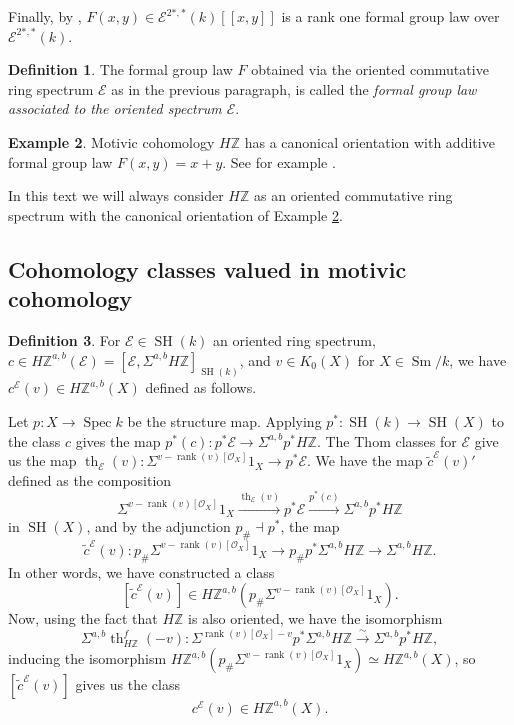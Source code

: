 \documentclass[10pt]{amsart}
\theoremstyle{definition}
\newtheorem{defn}{Definition}[section]
\newtheorem{exmp}[defn]{Example}
\theoremstyle{plain}
\numberwithin{equation}{section}
\newcommand{\0}{\emptyset}
\newcommand{\sE}{{\mathcal E}}
\newcommand{\sO}{{\mathcal O}}
\newcommand{\Z}{{\mathbb Z}}
\newcommand{\Spec}{{\operatorname{Spec}}}
\newcommand{\SH}{{\operatorname{SH}}}
\newcommand{\Sm}{{\operatorname{Sm}}}
\renewcommand{\th}{{\operatorname{th}}}
\newcommand{\rnk}{{\operatorname{rank}}}
\begin{document}
Finally, by \cite[Proposition 3.38]{Pan:oriented}, $F(x, y)\in  \sE^{2*,*}(k)[[x, y]]$ is a rank one formal group law over $\sE^{2*,*}(k)$.

\begin{defn}
    The formal group law $F$ obtained via the oriented commutative ring spectrum $\sE$ as in the previous paragraph, is called the \emph{formal group law associated to the oriented spectrum $\sE$}. 
\end{defn}

\begin{exmp}
\label{exmp:orientedHZ}
    Motivic cohomology $H\Z$ has a canonical orientation with additive formal group law $F(x,y)=x + y$. See for example \cite[Section 11.3]{deglise:mixmot}.  
\end{exmp}

In this text we will always consider $H\Z$ as an oriented commutative ring spectrum with the canonical orientation of Example \ref{exmp:orientedHZ}.

\subsection{Cohomology classes valued in motivic cohomology}
\label{sec:motiviccohomology}

\begin{defn}
\label{defn:HZclasses}
For $\sE\in \SH(k)$ an oriented ring spectrum, $c\in H\Z^{a,b}(\sE)=[\sE, \Sigma^{a,b}H\Z]_{\SH(k)}$, and $v\in K_0(X)$ for $X\in \Sm/k$, we have $c^\sE(v)\in H\Z^{a,b}(X)$ defined as follows. 

Let $p:X \to \Spec k$ be the structure map. Applying $p^*:\SH(k)\to \SH(X)$ to the class $c$ gives the map $p^*(c):p^*\sE\to \Sigma^{a,b}p^*H\Z$. 
The Thom classes for $\sE$ give us the map $\th_\sE(v):\Sigma^{v-\rnk(v)[\sO_X]}1_X\to p^*\sE$.  
We have the map $\tilde{c}^\sE(v)'$ defined as the composition
\[
\Sigma^{v-\rnk(v)[\sO_X]}1_X\xrightarrow{\th_\sE(v)} p^*\sE\xrightarrow{p^*(c)}\Sigma^{a,b}p^*H\Z
\]
in $\SH(X)$, and by the adjunction $p_\# \dashv p^*$, the map
\[
\tilde{c}^\sE(v):p_\#\Sigma^{v-\rnk(v)[\sO_X]}1_X\to p_{\#}p^*\Sigma^{a,b}H\Z \to \Sigma^{a,b}H\Z.
\]
In other words, we have constructed a class
\[
[\tilde{c}^\sE(v)]\in H\Z^{a,b}(p_\#\Sigma^{v-\rnk(v)[\sO_X]}1_X).
\]
 Now, using the fact that $H\Z$ is also oriented, we have the isomorphism
\[
\Sigma^{a,b}\th_{H\Z}^f(-v):\Sigma^{\rnk(v)[\sO_X]-v}p^*\Sigma^{a,b}H\Z\xrightarrow{\sim} \Sigma^{a,b}p^*H\Z,
\]
inducing the isomorphism $H\Z^{a,b}(p_\#\Sigma^{v-\rnk(v)[\sO_X]}1_X)\simeq H\Z^{a,b}(X)$, so
$[\tilde{c}^\sE(v)]$ gives us the class
\[
c^\sE(v)\in H\Z^{a,b}(X).
\]
\end{defn}
\end{document}
